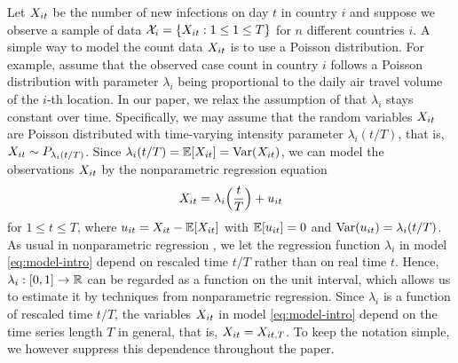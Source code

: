\documentclass[a4paper,12pt]{article}
\numberwithin{equation}{section}
\begin{document}
Let $X_{it}$ be the number of new infections on day $t$ in country $i$ and suppose we observe a sample of data $\mathcal{X}_i = \{ X_{it}: 1 \le 1 \le T \}$ for $n$ different countries $i$. A simple way to model the count data $X_{it}$ is to use a Poisson distribution. For example, \cite{De2020} assume that the observed case count in country $i$ follows a Poisson distribution with parameter $\lambda_i$ being proportional to the daily air travel volume of the $i$-th location. In our paper, we relax the assumption of \cite{De2020} that $\lambda_i$ stays constant over time. Specifically, we may assume that the random variables $X_{it}$ are Poisson distributed with time-varying intensity parameter $\lambda_i(t/T)$, that is, $X_{it} \sim P_{\lambda_i(t/T)}$. Since $\lambda_i(t/T) = \mathbb{E}[X_{it}] = \textnormal{Var}(X_{it})$, we can model the observations $X_{it}$ by the nonparametric regression equation 
\begin{equation}\label{eq:model-intro}
X_{it} = \lambda_i\Big(\frac{t}{T}\Big) + u_{it} 
\end{equation}
for $1 \le t \le T$, where $u_{it} = X_{it} - \mathbb{E}[X_{it}]$ with $\mathbb{E}[u_{it}] = 0$ and $\textnormal{Var}(u_{it}) = \lambda_i(t/T)$. As usual in nonparametric regression \citep[cp.][]{Robinson1989}, we let the regression function $\lambda_i$ in model \eqref{eq:model-intro} depend on rescaled time $t/T$ rather than on real time $t$.
Hence, $\lambda_i: [0,1] \rightarrow \mathbb{R}$ can be regarded as a function on the unit interval, which allows us to estimate it by techniques from nonparametric regression. 
Since $\lambda_i$ is a function of rescaled time $t/T$, the variables $X_{it}$ in model \eqref{eq:model-intro} depend on the time series length $T$ in general, that is, $X_{it} = X_{it,T}$. To keep the notation simple, we however suppress this dependence throughout the paper. 
\end{document}
